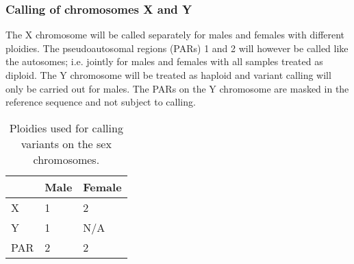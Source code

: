 \subsubsection{Calling of chromosomes X and Y}
The X chromosome will be called separately for males and females with different ploidies. The pseudoautosomal regions (PARs) 1 and 2 will however be called like the autosomes; i.e. jointly for males and females with all samples treated as diploid. The Y chromosome will be treated as haploid and variant calling will only be carried out for males. The PARs on the Y chromosome are masked in the reference sequence and not subject to calling.

\begin{table}[h]
\centering
\begin{tabular}{l|l|l|}
\cline{2-3}
\rowcolor[HTML]{FFFFFF} 
                          & Male & Female \\ \hline
\multicolumn{1}{|l|}{X}   & 1    & 2      \\ \hline
\multicolumn{1}{|l|}{Y}   & 1    & N/A    \\ \hline
\multicolumn{1}{|l|}{PAR} & 2    & 2      \\ \hline 
\end{tabular}
\caption{Ploidies used for calling variants on the sex chromosomes.}
\label{table:XYcalling}
\end{table}

